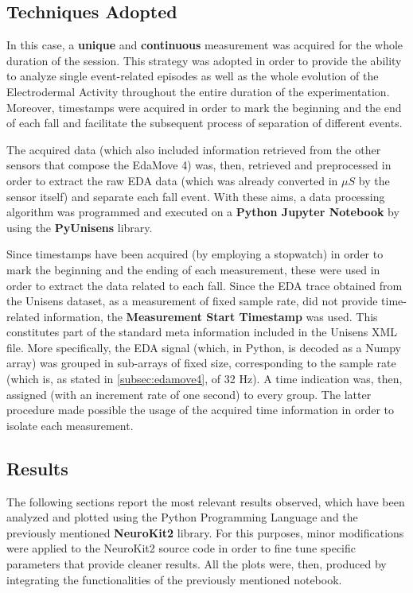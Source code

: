 \subsection{Techniques Adopted}\label{subsec:session-techniques}

In this case, a \textbf{unique} and \textbf{continuous} measurement was acquired for the whole duration of the session. This strategy was adopted in order to provide the ability to analyze single event-related episodes as well as the whole evolution of the Electrodermal Activity throughout the entire duration of the experimentation. Moreover, timestamps were acquired in order to mark the beginning and the end of each fall and facilitate the subsequent process of separation of different events.

The acquired data (which also included information retrieved from the other sensors that compose the EdaMove 4) was, then, retrieved and preprocessed in order to extract the raw EDA data (which was already converted in $\mu S$ by the sensor itself) and separate each fall event. With these aims, a data processing algorithm was programmed and executed on a \textbf{Python Jupyter Notebook} by using the \textbf{PyUnisens} library.

Since timestamps have been acquired (by employing a stopwatch) in order to mark the beginning and the ending of each measurement, these were used in order to extract the data related to each fall. Since the EDA trace obtained from the Unisens dataset, as a measurement of fixed sample rate, did not provide time-related information, the \textbf{Measurement Start Timestamp} was used. This constitutes part of the standard meta information included in the Unisens XML file. More specifically, the EDA signal (which, in Python, is decoded as a Numpy array) was grouped in sub-arrays of fixed size, corresponding to the sample rate (which is, as stated in \ref{subsec:edamove4}, of 32 Hz). A time indication was, then, assigned (with an increment rate of one second) to every group. The latter procedure made possible the usage of the acquired time information in order to isolate each measurement.

\subsection{Results}\label{subsec:results}

The following sections report the most relevant results observed, which have been analyzed and plotted using the Python Programming Language and the previously mentioned \textbf{NeuroKit2} library. For this purposes, minor modifications were applied to the NeuroKit2 source code in order to fine tune specific parameters that provide cleaner results. All the plots were, then, produced by integrating the functionalities of the previously mentioned notebook. 

